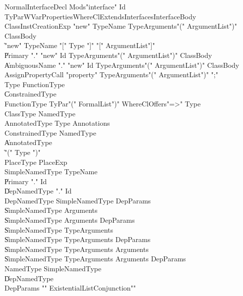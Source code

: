 {\begin{grammar}
 NormalInterfaceDecl  \: Mods\opt \xcd"interface" Id TyParWVar\opt Properties\opt WhereCl\opt ExtendsInterfaces\opt InterfaceBody\\
 ClassInstCreationExp  \: \xcd"new" TypeName TypeArguments\opt \xcd"(" ArgumentList\opt \xcd")" ClassBody\opt\\
    \| \xcd"new" TypeName \xcd"[" Type \xcd"]" \xcd"[" ArgumentList\opt \xcd"]"\\
    \| Primary \xcd"." \xcd"new" Id TypeArguments\opt \xcd"(" ArgumentList\opt \xcd")" ClassBody\opt\\
    \| AmbiguousName \xcd"." \xcd"new" Id TypeArguments\opt \xcd"(" ArgumentList\opt \xcd")" ClassBody\opt\\
 AssignPropertyCall  \: \xcd"property" TypeArguments\opt \xcd"(" ArgumentList\opt \xcd")" \xcd";"\\
 Type  \: FunctionType\\
    \| ConstrainedType\\
 FunctionType  \: TyPar\opt \xcd"(" FormalList\opt \xcd")" WhereCl\opt Offers\opt \xcd"=>" Type\\
 ClassType  \: NamedType\\
 AnnotatedType  \: Type Annotations\\
 ConstrainedType  \: NamedType\\
    \| AnnotatedType\\
    \| \xcd"(" Type \xcd")"\\
 PlaceType  \: PlaceExp\\
 SimpleNamedType  \: TypeName\\
    \| Primary \xcd"." Id\\
    \| DepNamedType \xcd"." Id\\
 DepNamedType  \: SimpleNamedType DepParams\\
    \| SimpleNamedType Arguments\\
    \| SimpleNamedType Arguments DepParams\\
    \| SimpleNamedType TypeArguments\\
    \| SimpleNamedType TypeArguments DepParams\\
    \| SimpleNamedType TypeArguments Arguments\\
    \| SimpleNamedType TypeArguments Arguments DepParams\\
 NamedType  \: SimpleNamedType\\
    \| DepNamedType\\
 DepParams  \: \xcd"{" ExistentialList\opt Conjunction\opt \xcd"}"\\

\end{grammar}}
